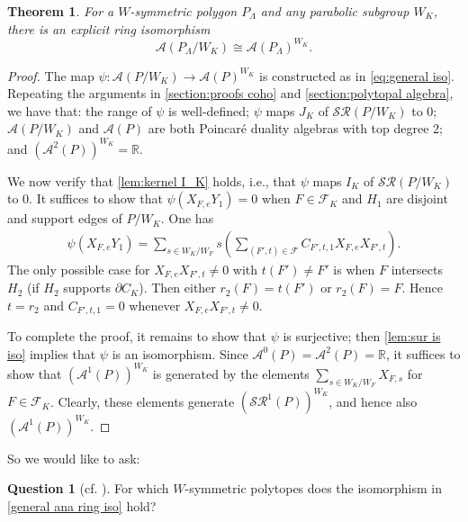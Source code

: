 \documentclass{amsart}
\theoremstyle{plain} \numberwithin{equation}{section}
\newtheorem{theorem}{Theorem}[section]
\theoremstyle{definition}
\newtheorem{question}{Question} \topmargin-2cm
\newcommand{\R}{\mathbb{R}}
\begin{document}
\begin{theorem}\label{generalization to polygons}
  For a $W$-symmetric polygon $P_{\Lambda}$ and any parabolic subgroup $W_K$,
  there is an explicit ring isomorphism
  $$\mathcal{A}(P_{\Lambda}/W_K)\cong \mathcal{A}(P_{\Lambda})^{W_K}.$$
\end{theorem}
\begin{proof}
   The map $\psi: \mathcal{A}(P/W_K)\to \mathcal{A}(P)^{W_K}$ is constructed as in \cref{eq:general iso}.  
   Repeating the arguments in \cref{section:proofs coho} and \cref{section:polytopal algebra}, we have that:
    the range of $\psi$ is well-defined; $\psi$ maps $J_K$ of $\mathcal{SR}(P/W_K)$ to 0; $\mathcal{A}(P/W_K)$ and $\mathcal{A}(P)$ are both Poincar\'{e}  duality algebras with top degree 2; and $(\mathcal{A}^2(P))^{W_K}=\R$.


    We now verify that \cref{lem:kernel I_K} holds, i.e., that $\psi$ maps $I_K$ of $\mathcal{SR}(P/W_K)$ to 0.
    It suffices to show that $\psi(X_{F,e}Y_{1})=0$ when $F\in \mathcal{F}_K$ and $H_1$ are disjoint and support edges of $P/W_K$. 
    One has
   \begin{align*}
    \psi\left(X_{F,e}Y_{1}\right)=\sum_{s\in {W_K}/{W_{F}}}s\left(\sum_{(F',t)\in\mathcal{F}}  C_{F',t,1}X_{F,e}X_{F',t}\right). 
  \end{align*} 
  The only possible case for $X_{F,e}X_{F',t}\ne 0$ with $t(F')\ne F'$ is when $F$ intersects $H_2$ (if $H_2$ supports $\partial C_K$). Then either $r_2(F)=t(F')$ or $r_2(F)=F$. Hence $t=r_2$ and $C_{F',t,1}=0$ whenever $X_{F,e}X_{F',t}\ne 0$.

  To complete the proof, it remains to show that $\psi$ is surjective; then \cref{lem:sur is iso} implies that $\psi$ is an isomorphism. Since $\mathcal{A}^0(P)=\mathcal{A}^2(P)=\R$, it suffices to show that  $(\mathcal{A}^1(P))^{W_K}$ is generated by the elements $\sum_{s\in W_K/W_F}X_{F,s}$ for $F\in\mathcal{F}_K$. Clearly, these elements generate $(\mathcal{SR}^1(P))^{W_K}$, and hence also $(\mathcal{A}^1(P))^{W_K}$.
\qedhere
\end{proof}


So we would like to ask:
\begin{question}[{cf. \cite[Question 8.2]{horiguchiToricOrbifoldsAssociated2024}}]
  For which $W$-symmetric polytopes does the isomorphism in \cref{general ana ring iso} hold?
\end{question}
\end{document}
